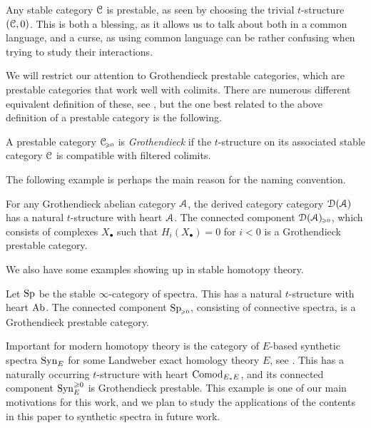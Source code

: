 \begin{remark}
    \label{ch3:rm:stable-is-prestable}
    Any stable category $\EuScript{C}$ is prestable, as seen by choosing the trivial $t$-structure $(\EuScript{C},0)$. This is both a blessing, as it allows us to talk about both in a common language, and a curse, as using common language can be rather confusing when trying to study their interactions.
\end{remark}

We will restrict our attention to Grothendieck prestable categories, which are prestable categories that work well with colimits. There are numerous different equivalent definition of these, see \cite[C.1.4.1]{lurie_SAG}, but the one best related to the above definition of a prestable category is the following. 

\begin{definition}
    A prestable category $\EuScript{C}_{\hspace{-1pt}\scriptscriptstyle\geqslant 0}$ is \emph{Grothendieck} if the $t$-structure on its associated stable category $\EuScript{C}$ is compatible with filtered colimits. 
\end{definition}

The following example is perhaps the main reason for the naming convention.

\begin{example}
    For any Grothendieck abelian category $\EuScript{A}$, the derived category category $\EuScript{D}(\EuScript{A})$ has a natural $t$-structure with heart $\EuScript{A}$. The connected component $\EuScript{D}(\EuScript{A})_{\hspace{-1pt}\scriptscriptstyle\geqslant 0}$, which consists of complexes $X_\bullet$ such that $H_i(X_\bullet) = 0$ for $i<0$ is a Grothendieck prestable category.  
\end{example}

We also have some examples showing up in stable homotopy theory. 

\begin{example}
    Let $\mathrm{Sp}$ be the stable $\infty$-category of spectra. This has a natural $t$-structure with heart $\mathrm{Ab}$. The connected component $\mathrm{Sp}_{\hspace{-1pt}\scriptscriptstyle\geqslant 0}$, consisting of connective spectra, is a Grothendieck prestable category. 
\end{example}

\begin{example}
    Important for modern homotopy theory is the category of $E$-based synthetic spectra $\mathrm{Syn}_{E}$ for some Landweber exact homology theory $E$, see \cite{pstragowski_2022}. This has a naturally occurring $t$-structure with heart $\mathrm{Comod}_{E_*E}$, and its connected component $\mathrm{Syn}_{E}^{\geqslant 0}$ is Grothendieck prestable. This example is one of our main motivations for this work, and we plan to study the applications of the contents in this paper to synthetic spectra in future work. 
\end{example}

